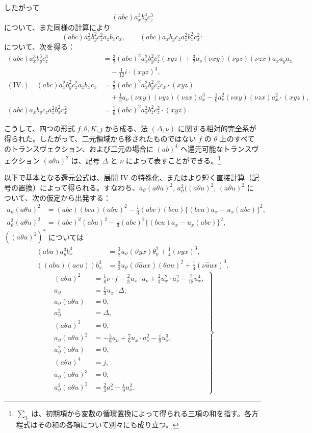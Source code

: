 \documentclass[11pt]{article}
\newcommand{\A}{\Delta}
\begin{document}
したがって
\[
(abc)a_x^3b_y^3c_z^3
\]
について、また同様の計算により
\[
(abc)a_x^2b_y^2c_z^2a_zb_xc_x,\qquad
(abc)a_xb_yc_za_z^2b_x^2c_x^2:
\]
について、次を得る：
\[
\begin{aligned}
(abc)a_x^3b_y^3c_z^3
&=\frac32(abc)^2a_x^2b_y^2c_z^2(xyz)
+\frac32 a_\nu(\nu xy)(\nu yz)(\nu zx)a_xa_ya_z\\
&\quad-\frac1{12}i\cdot(xyz)^3,\\[0.4em]
(\text{IV.})\quad
(abc)a_x^2b_y^2c_z^2a_zb_xc_x
&=\frac23(abc)^2a_x^2b_y^2c_z^2c_x\cdot(xyz)\\
&\quad+\frac13a_\nu(\nu xy)(\nu yz)(\nu zx)a_x^3
-\frac16 a_\nu^2(\nu xy)(\nu zx)a_x^2\cdot(xyz),\\[0.4em]
(abc)a_xb_yc_za_z^2b_x^2c_x^2
&=\frac16(abc)^2a_x^2b_z^2c_z^2\cdot(xyz).
\end{aligned}
\]

こうして、四つの形式 $f,\theta,K,j$ から成る、法 $(\A,\nu)$ に関する相対的完全系が得られた。したがって、二元領域から移されたものではない $f$ の $\theta$ 上のすべてのトランスヴェクション、および二元の場合に $(ab)^4$ へ還元可能なトランスヴェクション $(a\theta u)^2$ は、記号 $\A$ と $\nu$ によって表すことができる。\footnote{$\sum_3$ は、初期項から変数の循環置換によって得られる三項の和を指す。各方程式はその和の各項について別々にも成り立つ。}

以下で基本となる還元公式は、展開 IV の特殊化、またはより短く直接計算（記号の置換）によって得られる。すなわち、$a_\vartheta(a\theta u)^2$, $a_\vartheta^2((a\theta u)^2$, $(a\theta u)^2$ について、次の仮定から出発する：
\[
\begin{aligned}
a_\vartheta(a\theta u)^2
&=(abc)(bcu)(abu)^2-\frac13(abc)(bcu)\{(bcu)a_x-u_x(abc)\}^2,\\
a_\vartheta^2(a\theta u)^2
&=(abc)^2(abu)^2-\frac13(abc)^2\{(bcu)a_x-u_x(abc)\}^2,
\end{aligned}
\]
$((a\theta u)^2)^{*}$ については
\[
\begin{aligned}
(abu)a_y^3b_x^3&=\frac32u_\vartheta(\vartheta yx)\theta_y^2+\frac14(\nu yx)^3,\\
((abu)(acu))b_x^3&=\frac32u_\vartheta(\vartheta\widehat{a}ux)(\theta au)^2+\frac14(\nu\widehat{a}ux)^3.
\end{aligned}
\]
\[
\left.
\begin{aligned}
(a\theta u)^2&=\frac16\nu\cdot f-\frac23u_x\cdot a_\nu
+\frac23u_x^2\cdot a_\nu^2-\frac{i}{18}u_x^4,\\
a_\vartheta&=\frac13u_x\cdot\A,\\
a_\vartheta(a\theta u)&=0,\\
a_\vartheta^2&=\A,\\
(a\theta u)^3&=0,\\
a_\vartheta(a\theta u)^2&=-\frac56a_\nu+\frac76u_x\cdot a_\nu^2-\frac{i}{9}u_x^3,\\
a_\vartheta^2(a\theta u)&=0,\\
(a\theta u)^4&=j,\\
a_\vartheta(a\theta u)^3&=0,\\
a_\vartheta^2(a\theta u)^2&=\frac23a_\nu^2-\frac{i}{9}u_x^2.
\end{aligned}
\right\} \tag{1}
\]
\end{document}
